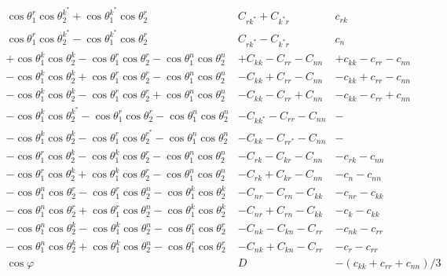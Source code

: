 \begin{table}[htb]
\begin{center}
\begin{adjustbox}{scale=0.85,center}
\begin{math}
\begin{array}{l|l|l}
\hline 
\cos \theta_1^r \cos \theta_2^{k^*} + \cos \theta_1^{k^*} \cos \theta_2^r & C_{r k^*}+C_{k^* r} & c_{r k} \\
\cos \theta_1^r \cos \theta_2^{k^*} - \cos \theta_1^{k^*} \cos \theta_2^r & C_{r k^*}-C_{k^* r} & c_n \\
\hline 
+ \cos \theta_1^k \cos \theta_2^k - \cos \theta_1^r \cos \theta_2^r - \cos \theta_1^n \cos \theta_2^n & + C_{k k} - C_{r r} - C_{n n} & + c_{k k} - c_{r r} - c_{n n} \\
- \cos \theta_1^k \cos \theta_2^k + \cos \theta_1^r \cos \theta_2^r - \cos \theta_1^n \cos \theta_2^n & - C_{k k} + C_{r r} - C_{n n} & - c_{k k} + c_{r r} - c_{n n} \\
- \cos \theta_1^k \cos \theta_2^k - \cos \theta_1^r \cos \theta_2^r + \cos \theta_1^n \cos \theta_2^n & - C_{k k} - C_{r r} + C_{n n} & - c_{k k} - c_{r r} + c_{n n} \\
\hline 
- \cos \theta_1^k \cos \theta_2^{k^*} - \cos \theta_1^r \cos \theta_2^r - \cos \theta_1^n \cos \theta_2^n & - C_{k k^*} - C_{r r} - C_{n n} & - \\
- \cos \theta_1^k \cos \theta_2^k - \cos \theta_1^r \cos \theta_2^{r^*} - \cos \theta_1^n \cos \theta_2^n & - C_{k k} - C_{r r^*} - C_{n n} & - \\
\hline
- \cos \theta_1^r \cos \theta_2^k - \cos \theta_1^k \cos \theta_2^r - \cos \theta_1^n \cos \theta_2^n & - C_{r k} - C_{k r} - C_{n n} & - c_{r k} - c_{n n} \\
- \cos \theta_1^r \cos \theta_2^k + \cos \theta_1^k \cos \theta_2^r - \cos \theta_1^n \cos \theta_2^n & - C_{r k} + C_{k r} - C_{n n} & - c_{n} - c_{n n} \\
- \cos \theta_1^n \cos \theta_2^r - \cos \theta_1^r \cos \theta_2^n - \cos \theta_1^k \cos \theta_2^k & - C_{n r} - C_{r n} - C_{k k} & - c_{n r} - c_{k k} \\
- \cos \theta_1^n \cos \theta_2^r + \cos \theta_1^r \cos \theta_2^n - \cos \theta_1^k \cos \theta_2^k & - C_{n r} + C_{r n} - C_{k k} & - c_{k} - c_{k k} \\
- \cos \theta_1^n \cos \theta_2^k - \cos \theta_1^k \cos \theta_2^n - \cos \theta_1^r \cos \theta_2^r & - C_{n k} - C_{k n} - C_{r r} & - c_{n k} - c_{r r} \\
- \cos \theta_1^n \cos \theta_2^k + \cos \theta_1^k \cos \theta_2^n - \cos \theta_1^r \cos \theta_2^r & - C_{n k} + C_{k n} - C_{r r} & - c_{r} - c_{r r} \\
\hline 
\cos \varphi & D & -\left(c_{k k}+c_{r r}+c_{n n}\right) / 3 \\

\end{array}
\end{math}
\end{adjustbox}
\end{center}
\end{table}
